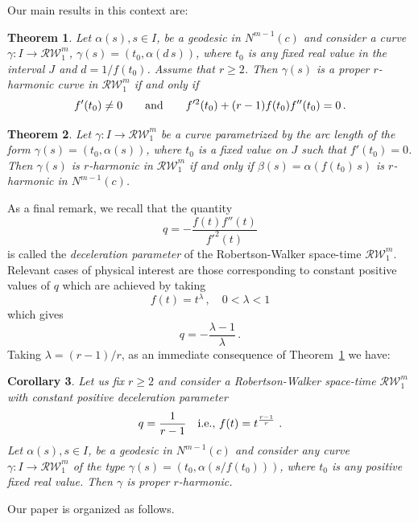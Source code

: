 \documentclass[11pt]{amsart}
\theoremstyle{plain}
\newtheorem{theorem}                {Theorem}      [section]
\newtheorem{corollary}    [theorem]  {Corollary}
\theoremstyle{definition}
\numberwithin{equation}{section}
\begin{document}
Our main results in this context are:
\begin{theorem}\label{biharmonic-cond-Robertson-Walker}
Let $\alpha(s), s \in I$, be a geodesic in $N^{m-1}(c)$ and consider a curve $\gamma : I \to \mathcal{RW}^{m}_1$, $\gamma(s) = (t_0, \alpha(d\,s))$, where $t_0$ is any fixed real value in the interval $J$ and $d=1/f(t_0)$. Assume that $r \geq 2$. Then $\gamma(s)$ is a proper $r$-harmonic curve in $\mathcal{RW}^{m}_1$ if and only if
\[
f'(t_0) \neq 0\qquad{\rm and}\qquad  f'^2(t_0) + (r-1)f(t_0)f''(t_0) = 0\,.
\]

\end{theorem}
\begin{theorem}\label{Th-2-RW}
Let $\gamma : I \to \mathcal{RW}^{m}_1$ be a curve parametrized by the arc length of the form $\gamma(s) = (t_0, \alpha(s))$, where $t_0$ is a fixed value on $J$ such that $f'(t_0)=0$. Then $\gamma(s)$ is $r$-harmonic in $\mathcal{RW}^{m}_1$ if and only if $\beta(s)=\alpha(f(t_0)\,s)$ is $r$-harmonic in $N^{m-1}(c)$.
\end{theorem}
As a final remark, we recall that the quantity
\[
q=- \frac{f(t)f''(t)}{f'^2(t)}
\]
is called the \textit{deceleration parameter} of the Robertson-Walker space-time $\mathcal{RW}^{m}_1$. Relevant cases of physical interest are those corresponding to constant positive values of $q$ which are achieved by taking 
\[
f(t)=t^\lambda\,, \quad 0<\lambda<1
\]
which gives
\[
q=-\frac{\lambda-1}{\lambda}\,.
\] 
Taking $\lambda=(r-1)/r$, as an immediate consequence of Theorem~\ref{biharmonic-cond-Robertson-Walker} we have:
\begin{corollary}\label{Cor-RW} Let us fix $r\geq2$ and consider a Robertson-Walker space-time $\mathcal{RW}^{m}_1$ with constant positive deceleration parameter 
\[
q=\frac{1}{r-1} \quad {\rm i.e.,} \,\, f(t)=t^{\frac{r-1}{r}}\,\,.
\]
Let $\alpha(s), s \in I$, be a geodesic in $N^{m-1}(c)$ and consider any curve $\gamma : I \longrightarrow \mathcal{RW}^{m}_1$ of the type $\gamma(s) = (t_0, \alpha(s/f(t_0)))$, where $t_0$ is any positive fixed real value. Then $\gamma$ is proper $r$-harmonic.
\end{corollary}


Our paper is organized as follows. 
\end{document}
